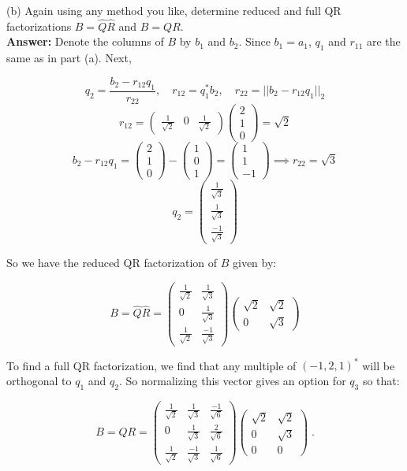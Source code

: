\documentclass[11pt]{article}
\begin{document}
(b) Again using any method you like, determine reduced and full QR factorizations $B = \hat{Q}\hat{R}$ and $B = QR$. \\

\textbf{Answer:} Denote the columns of $B$ by $b_1$ and $b_2$. Since $b_1 = a_1$, $q_1$ and $r_{11}$ are the same as in part (a). Next,

$$q_2 = \frac{b_2 - r_{12}q_1}{r_{22}}, \quad r_{12} = q_1^*b_2, \quad r_{22} = ||b_2 - r_{12}q_1||_2$$
$$r_{12} = \begin{pmatrix} \frac{1}{\sqrt{2}} & 0 & \frac{1}{\sqrt{2}}\end{pmatrix} \begin{pmatrix} 2 \\ 1 \\ 0 \end{pmatrix} = \sqrt{2}$$
$$b_2 - r_{12}q_1 = \begin{pmatrix} 2 \\ 1 \\ 0 \end{pmatrix} - \begin{pmatrix} 1 \\ 0 \\ 1 \end{pmatrix} =
\begin{pmatrix} 1 \\ 1 \\ -1 \end{pmatrix} \implies r_{22} = \sqrt{3}$$
$$q_2 = \begin{pmatrix}\frac{1}{\sqrt{3}} \\ \frac{1}{\sqrt{3}} \\ \frac{-1}{\sqrt{3}}\end{pmatrix}$$

So we have the reduced QR factorization of $B$ given by:

$$B = \hat{Q}\hat{R} =
\begin{pmatrix} \frac{1}{\sqrt{2}} & \frac{1}{\sqrt{3}} \\
0 & \frac{1}{\sqrt{3}} \\
\frac{1}{\sqrt{2}} & \frac{-1}{\sqrt{3}}\end{pmatrix}
\begin{pmatrix}
\sqrt{2} &\sqrt{2} \\ 0 & \sqrt{3} \end{pmatrix}$$

To find a full QR factorization, we find that any multiple of $(-1, 2, 1)^*$ will be orthogonal to $q_1$ and $q_2$. So normalizing this vector gives an option for $q_3$ so that:

$$B = QR = \begin{pmatrix} \frac{1}{\sqrt{2}} & \frac{1}{\sqrt{3}}& \frac{-1}{\sqrt{6}} \\
0 & \frac{1}{\sqrt{3}} & \frac{2}{\sqrt{6}}\\
\frac{1}{\sqrt{2}} & \frac{-1}{\sqrt{3}} & \frac{1}{\sqrt{6}}\end{pmatrix}
\begin{pmatrix}
\sqrt{2} &\sqrt{2} \\ 0 & \sqrt{3}  \\ 0 & 0\end{pmatrix} \; .$$
\end{document}
